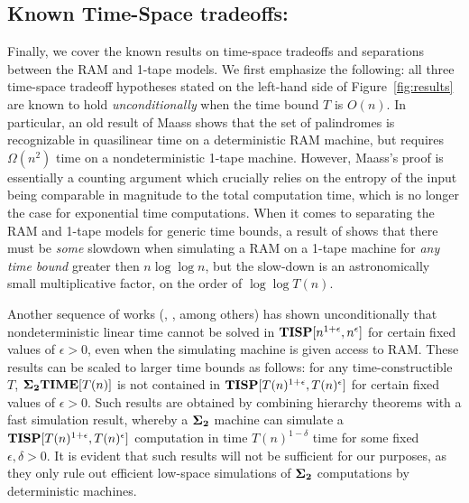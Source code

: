 \documentclass[11pt]{article}
\def\cl{\bf}
\begin{document}
\subsection{Known Time-Space tradeoffs:}\label{subsec:known-tradeoffs}
Finally, we cover the known results on time-space tradeoffs and separations between the RAM and 1-tape models. We first emphasize the following: all three time-space tradeoff hypotheses stated on the left-hand side of Figure~\ref{fig:results} are known to hold \emph{unconditionally} when the time bound $T$ is $O(n)$. In particular, an old result of Maass \cite{palindromes} shows that the set of palindromes is recognizable in quasilinear time on a deterministic RAM machine, but requires $\Omega(n^2)$ time on a nondeterministic 1-tape machine. However, Maass's proof is essentially a counting argument which crucially relies on the entropy of the input being comparable in magnitude to the total computation time, which is no longer the case for exponential time computations. When it comes to separating the RAM and 1-tape models for generic time bounds, a result of \cite{robson} shows that there must be \emph{some} slowdown when simulating a RAM on a 1-tape machine for \emph{any time bound} greater then $n \log \log n$, but the slow-down is an astronomically small multiplicative factor, on the order of $\log \log T(n)$. 

Another sequence of works (\cite{fortnow}, \cite{tisp-sat}, \cite{williams-tisp} among others) has shown unconditionally that nondeterministic linear time cannot be solved in ${\cl TISP}[n^{1+\epsilon}, n^{\epsilon}]$ for certain fixed values of $\epsilon>0$, even when the simulating machine is given access to RAM. These results can be scaled to larger time bounds as follows: for any time-constructible $T$, ${\cl \Sigma_2 TIME}[T(n)]$ is not contained in ${\cl TISP}[T(n)^{1+\epsilon}, T(n)^{\epsilon}]$ for certain fixed values of $\epsilon>0$. Such results are obtained by combining hierarchy theorems with a fast simulation result, whereby a ${\cl \Sigma_2}$ machine can simulate a ${\cl TISP}[T(n)^{1+\epsilon}, T(n)^{\epsilon}]$ computation in time $T(n)^{1 - \delta}$ time for some fixed $\epsilon, \delta > 0$. It is evident that such results will not be sufficient for our purposes, as they only rule out efficient low-space simulations of ${\cl \Sigma_2}$ computations by deterministic machines.
\end{document}
